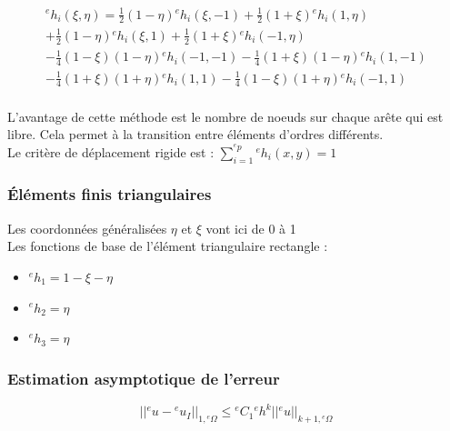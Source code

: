 \documentclass[../main.tex]{subfiles}
\begin{document}
\begin{equation}
    \begin{gathered}
        {}^eh_i(\xi, \eta) = \frac{1}{2}(1-\eta) {}^eh_i(\xi,-1)  + \frac{1}{2}(1+\xi) {}^eh_i(1,\eta)\\
         + \frac{1}{2}(1-\eta) {}^eh_i(\xi,1)  + \frac{1}{2}(1+\xi) {}^eh_i(-1,\eta)\\
        - \frac{1}{4}(1-\xi)(1-\eta) {}^eh_i(-1,-1) - \frac{1}{4}(1+\xi)(1-\eta) {}^eh_i(1,-1)\\
        - \frac{1}{4}(1+\xi)(1+\eta) {}^eh_i(1,1) - \frac{1}{4}(1-\xi)(1+\eta) {}^eh_i(-1,1)\\
    \end{gathered}
\end{equation}

L'avantage de cette méthode est le nombre de noeuds sur chaque arête qui est libre. Cela permet à la transition entre éléments d'ordres différents.\\

\warning Le critère de déplacement rigide est : $\sum_{i=1}^{{}^ep} {}^eh_i(x,y)=1$\\

\subsubsection{Éléments finis triangulaires}
\warning Les coordonnées généralisées $\eta$ et $\xi$ vont ici de 0 à 1\\

Les fonctions de base de l'élément triangulaire rectangle : \begin{itemize}
    \item ${}^eh_1 = 1-\xi-\eta$\\
    \item ${}^eh_2 = \eta$\\
    \item ${}^eh_3 = \eta$\\
\end{itemize}

\subsubsection{Estimation asymptotique de l'erreur}
\begin{equation}
    \lvert \lvert {}^eu-{}^eu_I\rvert \rvert_{1, {}^e\Omega} \leq {}^eC_1 {}^eh^k \lvert \lvert {}^eu\rvert \rvert_{k+1, {}^e\Omega}
\end{equation}
\end{document}
